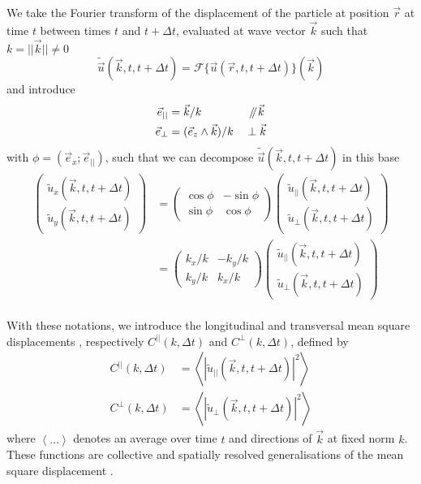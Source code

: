 \documentclass[class=report, float=false, crop=false]{standalone}
\begin{document}
We take the Fourier transform of the displacement of the particle at position $\vec{r}$ at time $t$ between times $t$ and $t + \Delta t$, evaluated at wave vector $\vec{k}$ such that $k = ||\vec{k}|| \neq 0$
\begin{equation}
\tilde{\vec{u}}(\vec{k}, t, t + \Delta t) = \mathcal{F}\{\vec{u}(\vec{r}, t, t + \Delta t)\}(\vec{k})
\end{equation}
and introduce
\begin{equation}
\begin{aligned}
\vec{e}_{||} &= \vec{k}/k &&~\mathbin{\!/\mkern-5mu/\!} \vec{k}\\
\vec{e}_{\perp} &= (\vec{e}_z\wedge\vec{k})/k &&\perp \vec{k}
\end{aligned}
\end{equation}
with $\phi = (\vec{e}_x ; \vec{e}_{||})$, such that we can decompose $\tilde{\vec{u}}(\vec{k}, t, t + \Delta t)$ in this base \cite{stackexchange}
\begin{equation}
\begin{aligned}
\begin{pmatrix} \tilde{u}_x(\vec{k}, t, t + \Delta t) \\ \tilde{u}_y(\vec{k}, t, t + \Delta t) \end{pmatrix} &= \begin{pmatrix} \cos\phi & -\sin\phi \\ \sin\phi & \cos\phi \end{pmatrix} \begin{pmatrix} \tilde{u}_{||}(\vec{k}, t, t + \Delta t) \\ \tilde{u}_{\perp}(\vec{k}, t, t + \Delta t) \end{pmatrix}\\
&= \begin{pmatrix} k_x/k & -k_y/k \\ k_y/k & k_x/k \end{pmatrix} \begin{pmatrix} \tilde{u}_{||}(\vec{k}, t, t + \Delta t) \\ \tilde{u}_{\perp}(\vec{k}, t, t + \Delta t) \end{pmatrix}
\label{u_cmsd}
\end{aligned}
\end{equation}
\mbox{}\\

With these notations, we introduce the longitudinal and transversal mean square displacements \cite{illing2016strain, klix2012glass}, respectively $C^{||}(k, \Delta t)$ and $C^{\perp}(k, \Delta t)$, defined by
\begin{equation}
\begin{aligned}
C^{||}(k, \Delta t) &= \left<|\tilde{u}_{||}(\vec{k}, t, t + \Delta t)|^2\right>\\
C^{\perp}(k, \Delta t) &= \left<|\tilde{u}_{\perp}(\vec{k}, t, t + \Delta t)|^2\right>
\end{aligned}
\label{cmsd_definition}
\end{equation}
where $\left<\ldots\right>$ denotes an average over time $t$ and directions of $\vec{k}$ at fixed norm $k$. These functions are collective and spatially resolved generalisations of the mean square displacement \cite{illing2016strain}.\\
\end{document}
